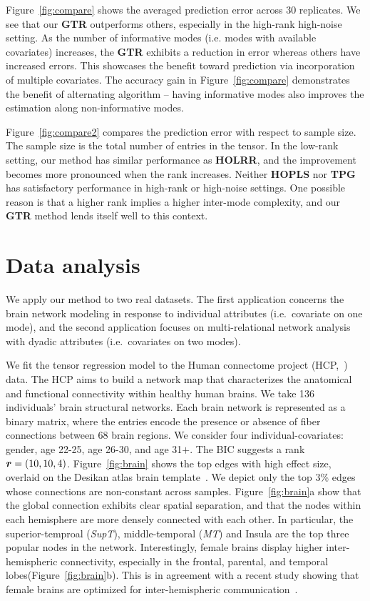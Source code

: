 \documentclass{article}
\theoremstyle{plain}
\theoremstyle{definition}
\begin{document}
Figure~\ref{fig:compare} shows the averaged prediction error across 30 replicates. We see that our {\bf GTR} outperforms others, especially in the high-rank high-noise setting. As the number of informative modes (i.e. modes with available covariates) increases, the {\bf GTR} exhibits a reduction in error whereas others have increased errors. This showcases the benefit toward prediction via incorporation of multiple covariates.  The accuracy gain in Figure~\ref{fig:compare} demonstrates the benefit of alternating algorithm -- having informative modes also improves the estimation along non-informative modes. 


Figure~\ref{fig:compare2} compares the prediction error with respect to sample size. The sample size is the total number of entries in the tensor. In the low-rank setting, our method has similar performance as {\bf HOLRR}, and the improvement becomes more pronounced when the rank increases. Neither {\bf HOPLS} nor {\bf TPG} has satisfactory performance in high-rank or high-noise settings. One possible reason is that a higher rank implies a higher inter-mode complexity, and our {\bf GTR} method lends itself well to this context. 


\vspace{-.2cm}
\section{Data analysis}
\vspace{-.2cm}
We apply our method to two real datasets. The first application concerns the brain network modeling in response to individual attributes (i.e.\ covariate on one mode), and the second application focuses on multi-relational network analysis with dyadic attributes (i.e.\ covariates on two modes). 

We fit the tensor regression model to the Human connectome project (HCP,~\citep{HCP}) data. The  HCP aims to build a network map  that characterizes the anatomical and functional connectivity within healthy human brains. We take 136 individuals' brain structural networks. Each brain network is represented as a binary matrix, where the entries encode the presence or absence of fiber connections between 68 brain regions. We consider four individual-covariates: gender, age 22-25, age 26-30, and age 31$+$. The BIC suggests a rank $\bm{r}=(10,10,4)$. Figure~\ref{fig:brain} shows the top edges with high effect size, overlaid on the Desikan atlas brain template~\cite{xia2013brainnet}.  We depict only the top 3\% edges whose connections are non-constant across samples.  Figure~\ref{fig:brain}a show that the global connection exhibits clear spatial separation, and that the nodes within each hemisphere are more densely connected with each other. In particular, the superior-temproal (\emph{SupT}), middle-temporal (\emph{MT}) and Insula are the top three popular nodes in the network. Interestingly, female brains display higher inter-hemispheric connectivity, especially in the frontal, parental, and temporal lobes(Figure~\ref{fig:brain}b). This is in agreement with a recent study showing that female brains are optimized for inter-hemispheric communication~\cite{ingalhalikar2014sex}. \\
\end{document}

